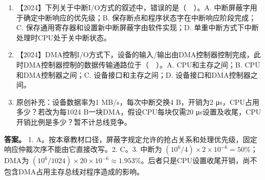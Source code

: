 \begin{enumerate}
\def\labelenumi{\arabic{enumi}.}
\tightlist
\item
  【2024】下列关于中断I/O方式的叙述中，错误的是（　）。A. 中断屏蔽字用于确定中断响应的优先级；B. 保存断点和程序状态字在中断响应阶段完成；C. 保存通用寄存器和设置新中断屏蔽字由软件实现；D. 单重中断方式下中断处理时CPU处于关中断状态。
\item
  【2024】DMA控制I/O方式下，设备的输入/输出由DMA控制器控制完成，此时DMA控制器控制的数据传输通路位于（　）。A. CPU和主存之间；B. CPU和DMA控制器之间；C. 设备接口和主存之间；D. 设备接口和DMA控制器之间。
\item
  原创补充：设备数据率为1 MB/s，每次中断交换4 B，开销为2 μs，CPU占用多少？若改为每1024 B一块DMA，假设CPU每块仅需20 μs设置及收尾，CPU开销比例是多少？暂不计总线竞争。
\end{enumerate}

\textbf{答案。} 1. A。按本章教材口径，屏蔽字规定允许的抢占关系和处理优先级，固定响应仲裁次序不能由它直接改写。2. C。3. 中断为 \((10^6/4)\times2\times10^{-6}=50\%\)；DMA为 \((10^6/1024)\times20\times10^{-6}\approx1.953\%\)。后者只是CPU设置收尾开销，尚不包含DMA占用主存总线对程序造成的影响。
